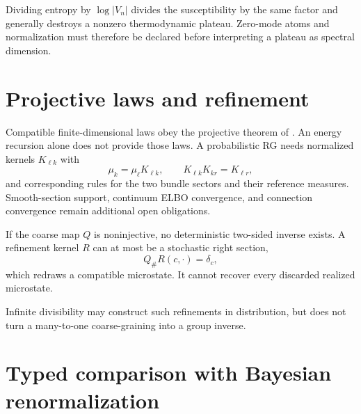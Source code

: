 Dividing entropy by \(\log|V_n|\) divides the susceptibility by the same
factor and generally destroys a nonzero thermodynamic plateau. Zero-mode atoms
and normalization must therefore be declared before interpreting a plateau as
spectral dimension. 

\section{Projective laws and refinement}
\label{sec:rg-projective-refinement}

Compatible finite-dimensional laws obey the projective theorem of
. An energy recursion alone does not provide
those laws. A probabilistic RG needs normalized kernels
\(K_{\ell k}\) with
\[
\mu_k=\mu_\ell K_{\ell k},\qquad
K_{\ell k}K_{kr}=K_{\ell r},
\]
and corresponding rules for the two bundle sectors and their reference
measures. Smooth-section support, continuum ELBO convergence, and connection
convergence remain additional open obligations. 

If the coarse map \(Q\) is noninjective, no deterministic two-sided inverse
exists. A refinement kernel \(R\) can at most be a stochastic right section,
\begin{equation}
Q_\#R(c,\cdot)=\delta_c,
\label{eq:rg-stochastic-right-section}
\end{equation}
which redraws a compatible microstate. It cannot recover every discarded
realized microstate. 

Infinite divisibility may construct such refinements in distribution, but does
not turn a many-to-one coarse-graining into a group inverse.

\section{Typed comparison with Bayesian renormalization}
\label{sec:rg-bayesian-comparison}

